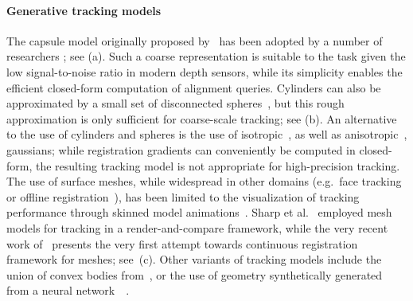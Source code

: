 \paragraph{Generative tracking models}
The capsule model originally proposed by~\cite{rehg1994tracking} has been adopted by a number of researchers \cite{oiko2011hand,schroder2014real,fleishman2015icpik,tagliasacchi2015robust}; see (a). Such a coarse representation is suitable to the task given the low signal-to-noise ratio in modern depth sensors, while its simplicity enables the efficient closed-form computation of alignment queries. Cylinders can also be approximated by a small set of disconnected spheres~\cite{qian2014realtime}, but this rough approximation is only sufficient for coarse-scale tracking; see (b). An alternative to the use of cylinders and spheres is the use of isotropic~\cite{sridhar2013multicam,sridhar2015fast}, as well as anisotropic~\cite{sridhar2014anisotropic}, gaussians; while registration gradients can conveniently be computed in closed-form, the resulting tracking model is not appropriate for high-precision tracking.
% 
%
The use of surface meshes, while widespread in other domains (e.g.\ face tracking~\cite{bouaziz2013online} or offline registration~\cite{wang2013physics,loper_eccv14}), has been limited to the visualization of tracking performance through skinned model animations~\cite{tompson2014real,schroder2014real}. Sharp et al.~ employed mesh models for tracking in a render-and-compare framework, while the very recent work of~\cite{taylor2016concerto} presents the very first attempt towards continuous registration framework for meshes; see~(c).
%
Other variants of tracking models include the union of convex bodies from~\cite{melax2013dynamics}, or the use of geometry synthetically generated from a neural network~\cite{oberweger2015feedback}~.



